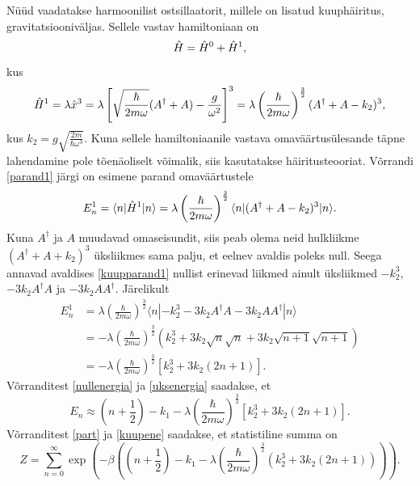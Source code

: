 \documentclass{trkut}%
\renewcommand\braket[1]{\langle{#1}\rangle}
\begin{document}
Nüüd vaadatakse harmoonilist ostsillaatorit, millele on lisatud kuuphäiritus, gravitatsiooniväljas. Sellele vastav hamiltoniaan on
\begin{equation}
    \op{H}=\op[0]{H}+\op[1]{H},
\end{equation}
kus
\begin{equation}
    \op[1]{H}=\lambda \op{x}^3 = \lambda \left[ \sqrt{\frac{\hbar}{2m\omega}}(A^\dagger + A) - \frac{g}{\omega^2}\right]^3=\lambda \left(\frac{\hbar}{2m\omega}\right)^\frac{3}{2} (A^\dagger + A - k_2)^3,
\end{equation}
kus $k_2=g\sqrt{\frac{2m}{\hbar \omega^3}}$.
Kuna sellele hamiltoniaanile vastava omaväärtusülesande täpne lahendamine pole tõenäoliselt võimalik, siis kasutatakse häiritusteooriat. Võrrandi \eqref{parand1} järgi on esimene parand omaväärtustele
\begin{equation}
    E_n^1=\braket{n|\op[1]{H}|n}=\lambda \left(\frac{\hbar}{2m\omega}\right)^\frac{3}{2} \braket{n|(A^\dagger + A - k_2)^3|n}.
    \label{kuupparand1}
\end{equation}
Kuna $A^\dagger$ ja $A$ muudavad omaseisundit, siis peab olema neid hulkliikme $(A^\dagger + A + k_2)^3$ üksliikmes sama palju, et eelnev avaldis poleks null. Seega annavad avaldises \eqref{kuupparand1} nullist erinevad liikmed ainult üksliikmed $-k_2^3$, $-3k_2A^\dagger A$ ja $-3k_2AA^\dagger$. Järelikult
\begin{align}
    E_n^1&=\lambda \left(\frac{\hbar}{2m\omega}\right)^\frac{3}{2} \braket{n|-k_2^3-3k_2A^\dagger A- 3k_2 A A^\dagger|n} \nonumber \\
    &= -\lambda \left(\frac{\hbar}{2m\omega}\right)^\frac{3}{2} (k_2^3 + 3k_2\sqrt{n}\sqrt{n} + 3k_2\sqrt{n+1}\sqrt{n+1}) \nonumber \\
    &= -\lambda \left(\frac{\hbar}{2m\omega}\right)^\frac{3}{2} [k_2^3 + 3k_2(2n+1)] \label{uksenergia}.
\end{align}
Võrranditest \eqref{nullenergia} ja \eqref{uksenergia} saadakse, et
\begin{equation}
    E_n \approx \left(n+\frac{1}{2}\right) - k_1 - \lambda \left(\frac{\hbar}{2m\omega}\right)^\frac{3}{2} [k_2^3 + 3k_2(2n+1)].
    \label{kuupene}
\end{equation}
Võrranditest \eqref{part} ja \eqref{kuupene} saadakse, et statistiline summa on
\begin{equation}
    Z=\sum_{n=0}^{\infty} \exp\left(-\beta \left(\left(n+\frac{1}{2}\right) - k_1 - \lambda \left(\frac{\hbar}{2m\omega}\right)^\frac{3}{2} (k_2^3 + 3k_2(2n+1)) \right)\right).
\end{equation}
\end{document}
